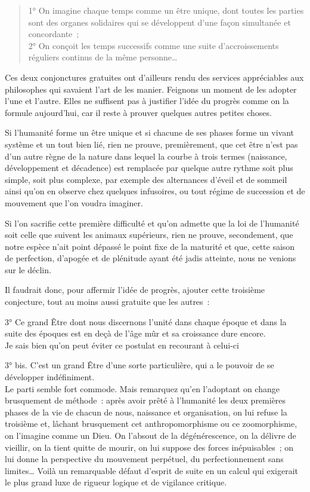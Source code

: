 \documentclass[french,twoside]{book} %
\newcommand{\astermono}{\medskip\centerline{\color{rubric}\large\selectfont{\syms ✻}}\medskip\par}%
\begin{document}
\begin{verse}
1° On imagine chaque temps comme un être unique, dont toutes les parties sont des organes solidaires qui se développent d’une façon simultanée et concordante ;\\
2° On conçoit les temps successifs comme une suite d’accroissements réguliers continus de la même personne…\\
\end{verse}
\noindent Ces deux conjonctures gratuites ont d’ailleurs rendu des services appréciables aux philosophes qui savaient l’art de les manier. Feignons un moment de les adopter l’une et l’autre. Elles ne suffisent pas à justifier l’idée du progrès comme on la formule aujourd’hui, car il reste à prouver quelques autres petites choses.\par

\astermono

\noindent Si l’humanité forme un être unique et si chacune de ses phases forme un vivant système et un tout bien lié, rien ne prouve, premièrement, que cet être n’est pas d’un autre règne de la nature dans lequel la courbe à trois termes (naissance, développement et décadence) est remplacée par quelque autre rythme soit plus simple, soit plus complexe, par exemple des alternances d’éveil et de sommeil ainsi qu’on en observe chez quelques infusoires, ou tout régime de succession et de mouvement que l’on voudra imaginer.\par
Si l’on sacrifie cette première difficulté et qu’on admette que la loi de l’humanité soit celle que suivent les animaux supérieurs, rien ne prouve, secondement, que notre espèce n’ait point dépassé le point fixe de la maturité et que, cette saison de perfection, d’apogée et de plénitude ayant été jadis atteinte, nous ne venions sur le déclin.\par
Il faudrait donc, pour affermir l’idée de progrès, ajouter cette troisième conjecture, tout au moins aussi gratuite que les autres :\par
3° Ce grand Être dont nous discernons l’unité dans chaque époque et dans la suite des époques est en deçà de l’âge mûr et sa croissance dure encore.\\
\noindent Je sais bien qu’on peut éviter ce postulat en recourant à celui-ci\par
3° bis. C’est un grand Être d’une sorte particulière, qui a le pouvoir de se développer indéfiniment.\\
\noindent Le parti semble fort commode. Mais remarquez qu’en l’adoptant on change brusquement de méthode : après avoir prêté à l’humanité les deux premières phases de la vie de chacun de nous, naissance et organisation, on lui refuse la troisième et, lâchant brusquement cet anthropomorphisme ou ce zoomorphisme, on l’imagine comme un Dieu. On l’absout de la dégénérescence, on la délivre de vieillir, on la tient quitte de mourir, on lui suppose des forces inépuisables ; on lui donne la perspective du mouvement perpétuel, du perfectionnement sans limites… Voilà un remarquable défaut d’esprit de suite en un calcul qui exigerait le plus grand luxe de rigueur logique et de vigilance critique.\par
\end{document}
